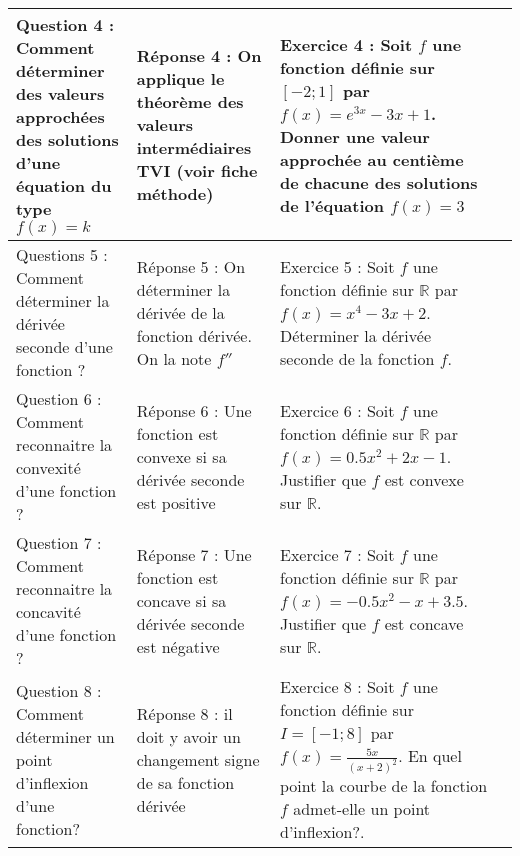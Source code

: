 \documentclass[10pt,a4paper,landscape]{article}
\begin{document}
\begin{tabular}{|p{6.5cm}|p{6.5cm}||p{6.5cm}|p{6.5cm}|}
			Question 4 : Comment déterminer des valeurs approchées des solutions d'une équation du type $f(x)=k$ &
			Réponse 4 : On applique le théorème des valeurs intermédiaires TVI (voir fiche méthode)&
			Exercice 4 : Soit $f$ une fonction définie sur $[-2;1]$  par $f(x)=e^{3x}-3x+1$. Donner une valeur approchée au centième de chacune des solutions de l'équation $f(x)=3$ &
			\cellcolor{gray!25} \\
			\hline
			
			Questions 5 : Comment déterminer la dérivée seconde d'une fonction ? &
			Réponse 5 : On déterminer la dérivée de la fonction dérivée.  On la note $f''$&
			Exercice 5 : Soit $f$ une fonction définie sur $\mathbb{R}$ par $f(x)=x^4-3x+2$. Déterminer la dérivée seconde de la fonction $f$.& 
			\cellcolor{gray!25}\\
			\hline
			
			Question 6 : Comment reconnaitre la convexité d'une fonction ? &
			Réponse 6 : Une fonction est convexe si sa dérivée seconde est positive &
			Exercice 6 : Soit $f$ une fonction définie sur $\mathbb{R}$ par $f(x)=0.5x^2+2x-1$. Justifier que $f$ est convexe sur $\mathbb{R}$. &
			\cellcolor{gray!25}\\
			\hline
			
			Question 7 : Comment reconnaitre la concavité d'une fonction ? &
			Réponse 7 : Une fonction est concave si sa dérivée seconde est négative&
			Exercice 7 : Soit $f$ une fonction définie sur $\mathbb{R}$ par $f(x)=-0.5x^2-x+3.5$. Justifier que $f$ est concave sur $\mathbb{R}$.&
			\cellcolor{gray!25}\\
			\hline
			
			Question 8 : Comment déterminer un point d'inflexion d'une fonction? &
			Réponse 8 : il doit y avoir un changement signe de sa fonction dérivée &
			Exercice 8 : Soit $f$ une fonction définie sur $I=[-1 ; 8]$ par $f(x)=\frac{5x}{(x+2)^2}$. En quel point la courbe de la fonction $f$ admet-elle un point d'inflexion?. &
			\cellcolor{gray!25}\\
			\hline	
		 \end{tabular}
		 
\end{document}
